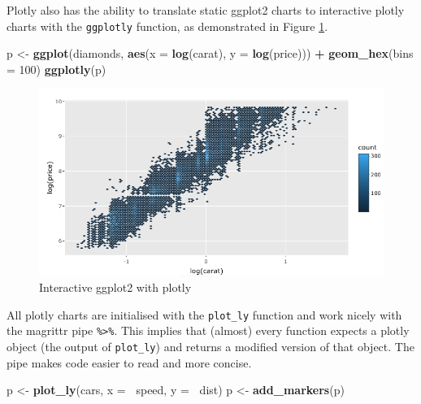 \documentclass[10pt,]{krantz}
\makeatletter
\newenvironment{Shaded}{\begin{snugshade}}{\end{snugshade}}
\newcommand{\DataTypeTok}[1]{\textcolor[rgb]{0.27,0.27,0.27}{#1}}
\newcommand{\DecValTok}[1]{\textcolor[rgb]{0.06,0.06,0.06}{#1}}
\newcommand{\KeywordTok}[1]{\textcolor[rgb]{0.27,0.27,0.27}{\textbf{#1}}}
\newcommand{\NormalTok}[1]{#1}
\newcommand{\OperatorTok}[1]{\textcolor[rgb]{0.43,0.43,0.43}{\textbf{#1}}}
\newcommand{\StringTok}[1]{\textcolor[rgb]{0.5,0.5,0.5}{#1}}
\newenvironment{kframe}{%
\medskip{}
\setlength{\fboxsep}{.8em}
 \def\at@end@of@kframe{}%
 \ifinner\ifhmode%
  \def\at@end@of@kframe{\end{minipage}}%
  \begin{minipage}{\columnwidth}%
 \fi\fi%
 \def\FrameCommand##1{\hskip\@totalleftmargin \hskip-\fboxsep
 \colorbox{shadecolor}{##1}\hskip-\fboxsep
     \hskip-\linewidth \hskip-\@totalleftmargin \hskip\columnwidth}%
 \MakeFramed {\advance\hsize-\width
   \@totalleftmargin\z@ \linewidth\hsize
   \@setminipage}}%
 {\par\unskip\endMakeFramed%
 \at@end@of@kframe}
\renewenvironment{Shaded}{\begin{kframe}}{\end{kframe}}
\makeatother
\begin{document}
Plotly also has the ability to translate static ggplot2 \citep{R-ggplot2} charts to interactive plotly charts with the \texttt{ggplotly} function, as demonstrated in Figure \ref{fig:plotly-ggplotly-diagram}.

\begin{Shaded}
\begin{Highlighting}[]
\NormalTok{p <-}\StringTok{ }\KeywordTok{ggplot}\NormalTok{(diamonds, }\KeywordTok{aes}\NormalTok{(}\DataTypeTok{x =} \KeywordTok{log}\NormalTok{(carat), }\DataTypeTok{y =} \KeywordTok{log}\NormalTok{(price))) }\OperatorTok{+}\StringTok{ }
\StringTok{  }\KeywordTok{geom_hex}\NormalTok{(}\DataTypeTok{bins =} \DecValTok{100}\NormalTok{)}
\KeywordTok{ggplotly}\NormalTok{(p)}
\end{Highlighting}
\end{Shaded}

\begin{figure}[H]

{\centering \includegraphics[width=1\linewidth]{images/03-ggplotly} 

}

\caption{Interactive ggplot2 with plotly}\label{fig:plotly-ggplotly-diagram}
\end{figure}

All plotly charts are initialised with the \texttt{plot\_ly} function and work nicely with the magrittr \citep{R-magrittr} pipe \texttt{\%\textgreater{}\%}. This implies that (almost) every function expects a plotly object (the output of \texttt{plot\_ly}) and returns a modified version of that object. The pipe makes code easier to read and more concise.

\begin{Shaded}
\begin{Highlighting}[]
\NormalTok{p <-}\StringTok{ }\KeywordTok{plot_ly}\NormalTok{(cars, }\DataTypeTok{x =} \OperatorTok{~}\NormalTok{speed, }\DataTypeTok{y =} \OperatorTok{~}\NormalTok{dist) }
\NormalTok{p <-}\StringTok{ }\KeywordTok{add_markers}\NormalTok{(p)}
\end{Highlighting}
\end{Shaded}
\end{document}
